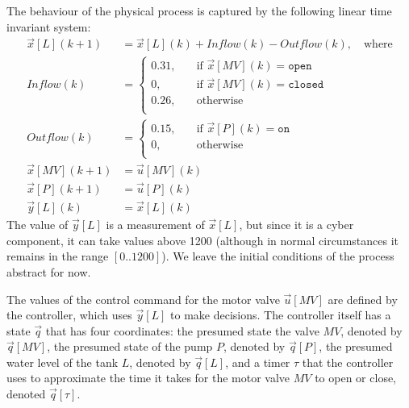 The behaviour of the physical process is captured by the following linear time invariant system:
\begin{align}
  \vec{x}[L](k+1)&= \vec{x}[L](k)+Inflow(k)-Outflow(k),\quad \text{where}\\
  Inflow(k)&=\begin{cases}
    0.31,&\quad \text{if $\vec{x}[MV](k)=\texttt{open}$}\\
    0,&\quad \text{if $\vec{x}[MV](k)=\texttt{closed}$}\\
    0.26,&\quad \text{otherwise}\\
  \end{cases}\\
  Outflow(k)&=\begin{cases}
    0.15,&\quad \text{if $\vec{x}[P](k)=\texttt{on}$}\\
    0,&\quad \text{otherwise}\\
  \end{cases}\\
  \vec{x}[MV](k+1)&=\vec{u}[MV](k)\\
  \vec{x}[P](k+1)&=\vec{u}[P](k)\\
  \vec{y}[L](k)&=\vec{x}[L](k)
\end{align}
The value of $\vec{y}[L]$ is a measurement of $\vec{x}[L]$, but since it is a cyber component, it can take values above 1200 (although in normal circumstances it remains in the range $[0..1200]$). We leave the initial conditions of the process abstract for now.

The values of the control command for the motor valve $\vec{u}[MV]$ are defined by the controller, which uses $\vec{y}[L]$ to make decisions. The controller itself has a state $\vec{q}$ that has four coordinates: the presumed state the valve $MV$, denoted by $\vec{q}[MV]$, the presumed state of the pump $P$, denoted by $\vec{q}[P]$, the presumed water level of the tank $L$, denoted by $\vec{q}[L]$,  and a timer $\tau$ that the controller uses to approximate the time it takes for the motor valve $MV$ to open or close, denoted $\vec{q}[\tau]$. %

